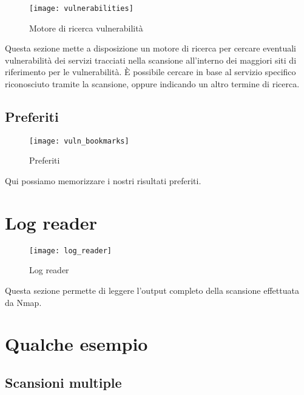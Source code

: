\begin{figure}[h]
  \centering
  \texttt{[image: vulnerabilities]}
  \caption{Motore di ricerca vulnerabilit\`a}
  \label{fig:VulnerabilityMain}
\end{figure}
Questa sezione mette a disposizione un motore di ricerca per cercare eventuali 
vulnerabilit\`a dei servizi tracciati nella scansione all'interno dei maggiori 
siti di riferimento per le vulnerabilit\`a. \`E possibile cercare in base al 
servizio specifico riconosciuto tramite la scansione, oppure indicando un altro 
termine di ricerca.

\section{Preferiti}
\label{sec:VulnerabilityBookmarks}

\begin{figure}[h]
  \centering
  \texttt{[image: vuln\_bookmarks]}
  \caption{Preferiti}
  \label{fig:VulnerabilityBookmarks}
\end{figure}
Qui possiamo memorizzare i nostri risultati preferiti.

\chapter{Log reader}
\label{ch:LogReader}

\begin{figure}[h]
  \centering
  \texttt{[image: log\_reader]}
  \caption{Log reader}
  \label{fig:LodReader}
\end{figure}
Questa sezione permette di leggere l'output completo della scansione 
effettuata da Nmap.

\chapter{Qualche esempio}
\label{ch:Examples}

\section{Scansioni multiple}
\label{sec:ExamplesMultipleScan}

